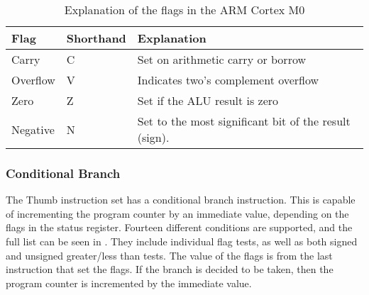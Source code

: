 \documentclass[12pt,a4paper]{article}
\begin{document}
\begin{bibunit}[is-unsrt]
%

\begin{table}
\centering
\begin{tabular}{p{}p{}p{}}\hline
Flag & Shorthand & Explanation \\ \hline
Carry & C & Set on arithmetic carry or borrow\\
Overflow & V & Indicates two's complement overflow\\
Zero & Z & Set if the ALU result is zero\\
Negative & N & Set to the most significant bit of the result (sign). \\
\end{tabular}
\caption{Explanation of the flags in the ARM Cortex M0}
\end{table}
\subsubsection{Conditional Branch}\label{arm:conditionalbranch}
The Thumb instruction set has a conditional branch instruction.
This is capable of incrementing the program counter by an immediate value, depending on the flags in the status register.
Fourteen different conditions are supported, and the full list can be seen in \cite{ARM:Thumb}.
They include individual flag tests, as well as both signed and unsigned greater/less than tests.
The value of the flags is from the last instruction that set the flags.%
If the branch is decided to be taken, then the program counter is incremented by the immediate value.


\end{bibunit}
\end{document}
